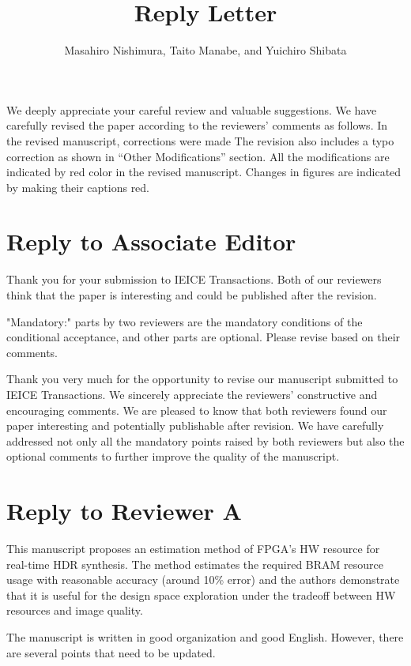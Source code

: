 \documentclass[a4j]{jsarticle}
\title{\bf \Large Reply Letter}
\author{Masahiro Nishimura, Taito Manabe, and Yuichiro Shibata}
\date{}
\begin{document}
\maketitle

We deeply appreciate your careful review and valuable suggestions.  
We have carefully revised the paper according to the reviewers' 
comments as follows.
In the revised manuscript, corrections were made The revision also includes a typo correction as shown in ``Other Modifications'' section. All the modifications are indicated by red color in the revised manuscript. Changes in figures are indicated by making their captions red.


\section*{Reply to Associate Editor}
\begin{screen}
Thank you for your submission to IEICE Transactions. Both of our reviewers
think that the paper is interesting and could be published after the revision. 

"Mandatory:" parts by two reviewers are the mandatory conditions
of the conditional acceptance, and other parts are optional.
Please revise based on their comments.
\end{screen}
Thank you very much for the opportunity to revise 
our manuscript submitted to IEICE Transactions.
We sincerely appreciate the reviewers’ constructive and encouraging comments.
We are pleased to know that both reviewers found our paper interesting and 
potentially publishable after revision.
We have carefully addressed not only all the mandatory points raised by both reviewers but also the optional comments to further improve the quality of the manuscript.


\section*{Reply to Reviewer A}

\begin{screen}
This manuscript proposes an estimation method of FPGA's HW resource for real-time HDR synthesis.
The method estimates the required BRAM resource usage with reasonable accuracy (around 10\% error)
and the authors demonstrate that it is useful for the design space exploration
under the tradeoff between HW resources and image quality.

The manuscript is written in good organization and good English.
However, there are several points that need to be updated.
\end{screen}
\end{document}
